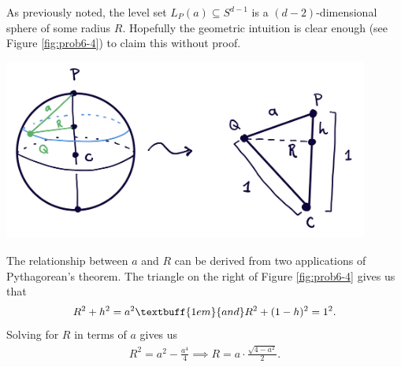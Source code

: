 \begin{homework}[e]
\begin{soln}
    As previously noted, the level set $L_P(a)\subseteq S^{d-1}$ is a $(d-2)$-dimensional sphere of some radius $R$. Hopefully the geometric intuition is clear enough (see Figure \ref{fig:prob6-4}) to claim this without proof. 
    \begin{center}
      \includegraphics[width=12cm]{figures/hwk1-drawing1.png}
      \label{fig:prob6-4}
    \end{center}
    The relationship between $a$ and $R$ can be derived from two applications of Pythagorean's theorem. The triangle on the right of Figure \ref{fig:prob6-4} gives us that
    \begin{align*}
      R^2 + h^2 = a^2 \textbuff{1em}{and} R^2 + (1 - h)^2 = 1^2.
    \end{align*}
    Solving for $R$ in terms of $a$ gives us
    \begin{align}\label{eqn:R-and-a}
      R^2 = a^2 - \frac{a^4}{4} \implies R = a\cdot \frac{\sqrt{4 - a^2}}{2}.
    \end{align}


\end{soln}
\end{homework}

